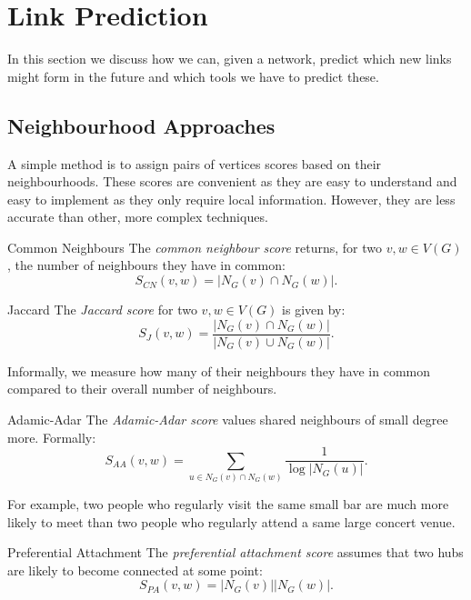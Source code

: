 \documentclass[english]{panikzettel}
\begin{document}
\section{Link Prediction}

In this section we discuss how we can, given a network, predict which new links might form in the future and which tools we have to predict these.

\subsection{Neighbourhood Approaches}

A simple method is to assign pairs of vertices scores based on their neighbourhoods.
These scores are convenient as they are easy to understand and easy to implement as they only require local information.
However, they are less accurate than other, more complex techniques.

\begin{halfboxl}
    \vspace{-\baselineskip}
    \begin{defi}{Common Neighbours}
        The \textit{common neighbour score} returns, for two $v,w \in V(G)$, the number of neighbours they have in common:
        \[
            S_{CN}(v,w)=|N_G(v) \cap N_G(w)|.
        \]
    \end{defi}

    \begin{defi}{Jaccard}
        The \textit{Jaccard score} for two $v,w \in V(G)$ is given by:
        \[
            S_J(v,w) = \frac{|N_G(v) \cap N_G(w)|}{|N_G(v) \cup N_G(w)|}.
        \]

        \footnotesize{}
        Informally, we measure how many of their neighbours they have in common compared to their overall number of neighbours.
    \end{defi}
\end{halfboxl}%
\begin{halfboxr}
    \vspace{-\baselineskip}
    \begin{defi}{Adamic-Adar}
        The \textit{Adamic-Adar score} values shared neighbours of small degree more.
        Formally: \[
            S_{AA}(v,w) = \sum_{u \in N_G(v) \cap N_G(w)} \frac{1}{\log |N_G(u)|}.
        \]

        \footnotesize{}
        For example, two people who regularly visit the same small bar are much more likely to meet than two people who regularly attend a same large concert venue.
    \end{defi}

    \begin{defi}{Preferential Attachment}
        The \textit{preferential attachment score} assumes that two hubs are likely to become connected at some point:
        \[
            S_{PA}(v,w) = |N_G(v)||N_G(w)|.
        \]
    \end{defi}
\end{halfboxr}
\end{document}

